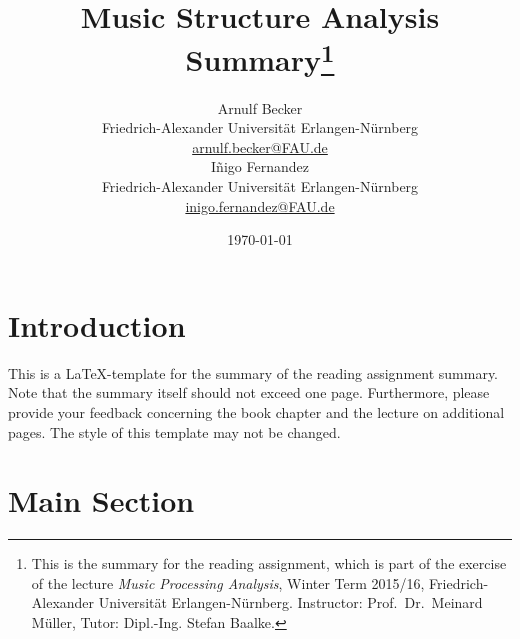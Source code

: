 \documentclass[a4paper, 9pt, twocolumn]{extarticle}
\begin{document}
\date{\normalsize \today}

\title{\vspace{-8mm}\textbf{\Large
Music Structure Analysis Summary\footnote{This is the summary for the reading assignment,
which is part of the exercise of the lecture \emph{Music Processing Analysis}, Winter Term 2015/16,
Friedrich-Alexander Universit\"at Erlangen-N\"urnberg.
Instructor: Prof.\ Dr.\ Meinard M\"uller,
Tutor: Dipl.-Ing. Stefan Baalke.
}}}

\author{
{
\begin{minipage}[t]{.45\textwidth}
\center
Arnulf Becker\\
\small
Friedrich-Alexander Universit\"at Erlangen-N\"urnberg
\protect\\{} %
\url{arnulf.becker@FAU.de}
\end{minipage}%
\begin{minipage}[t]{.45\textwidth}
\center
Iñigo Fernandez\\%
\small
Friedrich-Alexander Universit\"at Erlangen-N\"urnberg
\protect\\{} %
\url{inigo.fernandez@FAU.de}
\end{minipage}%
}
}
 
\maketitle
\thispagestyle{empty}

\section{Introduction}
\label{section:introduction}

This is a \LaTeX-template for the summary of the reading assignment summary. Note that the summary
itself should not exceed one page. Furthermore, please provide your feedback concerning the 
book chapter and the lecture on additional pages.
The style of this template may not be changed.



\section{Main Section}
\label{section:main}
\end{document}

